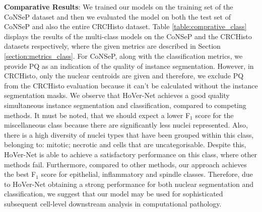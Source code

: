 \documentclass[journal]{IEEEtran}
\begin{document}
	\textbf{Comparative Results}: We trained our models on the training set of the CoNSeP dataset and then we evaluated the model on both the test set of CoNSeP and also the entire CRCHisto dataset. Table \ref{table:comprative_class} displays the results of the multi-class models on the CoNSeP and the CRCHisto datasets respectively, where the given metrics are described in Section \ref{section:metrics_class}. For CoNSeP, along with the classification metrics, we provide PQ as an indication of the quality of instance segmentation. However, in CRCHisto, only the nuclear centroids are given and therefore, we exclude PQ from the CRCHisto evaluation because it can't be calculated without the instance segmentation masks. We observe that HoVer-Net achieves a good quality simultaneous instance segmentation and classification, compared to competing methods. It must be noted, that we should expect a lower F$_1$ score for the miscellaneous class because there are significantly less nuclei represented. Also, there is a high diversity of nuclei types that have been grouped within this class, belonging to: mitotic; necrotic and cells that are uncategorisable. Despite this, HoVer-Net is able to achieve a satisfactory performance on this class, where other methods fail. Furthermore, compared to other methods, our approach achieves the best F$_1$ score for epithelial, inflammatory and spindle classes. Therefore, due to HoVer-Net obtaining a strong performance for both nuclear segmentation and classification, we suggest that our model may be used for sophisticated subsequent cell-level downstream analysis in computational pathology. 
	
	
\end{document}
